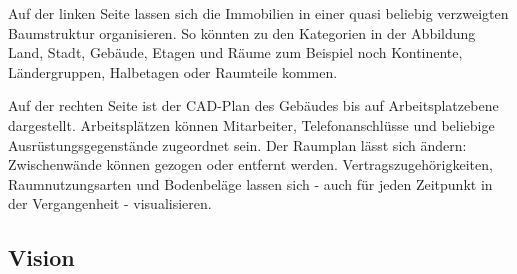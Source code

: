 Auf der linken Seite lassen sich die Immobilien in einer quasi beliebig 
verzweigten Baumstruktur organisieren. So könnten zu den Kategorien in der 
Abbildung Land, Stadt, Gebäude, Etagen und Räume zum Beispiel noch Kontinente, 
Ländergruppen, Halbetagen oder Raumteile kommen.

Auf der rechten Seite ist der CAD-Plan des Gebäudes bis auf Arbeitsplatzebene 
dargestellt. Arbeitsplätzen können Mitarbeiter, Telefonanschlüsse und beliebige 
Ausrüstungsgegenstände zugeordnet sein. Der Raumplan lässt sich ändern: 
Zwischenwände können gezogen oder entfernt werden. Vertragszugehörigkeiten, 
Raumnutzungsarten und Bodenbeläge lassen sich - auch für jeden Zeitpunkt in der 
Vergangenheit - visualisieren.

\subsection{Vision}
